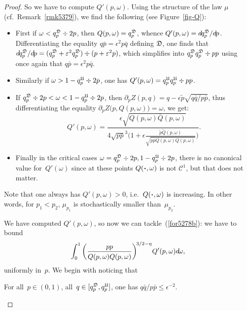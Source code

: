 \begin{proof}
So we have to compute $Q'(p,\omega)$.
Using the structure of the law $\mu$ (cf.\ Remark~\ref{rmk5379}),
we find the following (see Figure~\ref{fig-Q}):
%
\begin{itemize}
\item First if $\omega < q^{\mathfrak{D}}_p \div 2p$, then $Q(p,\omega) = q^{\mathfrak{D}}_p$,
whence $Q'(p,\omega) = \dx{q^{\mfrak{D}}_p}/\dx{p}$.
Differentiating the equality $q\bar{p}=\epsilon^2p\bar{q}$ defining $\mathfrak{D}$,
one finds that $\dx{q^{\mfrak{D}}_p}/\dx{p} = (q^{\mfrak{D}}_p + \epsilon^2\bar{q}^{\mfrak{D}}_p) \div (\bar{p}+\epsilon^2p)$,
which simplifies into $q^{\mfrak{D}}_p\bar{q}^{\mfrak{D}}_p \div p\bar{p}$ using once again
that $q\bar{p}=\epsilon^2p\bar{q}$.
\item Similarly if $\omega > 1 - \bar{q}^{\mfrak{U}}_p \div 2\bar{p}$,
one has $Q'(p,\omega) = q^{\mfrak{U}}_p\bar{q}^{\mfrak{U}}_p \div p\bar{p}$.
\item If $q^{\mfrak{D}}_p \div 2p < \omega < 1 - \bar{q}^{\mfrak{U}}_p \div 2\bar{p}$, then
$\partial_p Z(p,q) = q-\epsilon\tilde{p}\sqrt{q\bar{q}/p\bar{p}}$,
thus differentiating the equality $\partial_p Z \big(p,Q(p,\omega)\big) = \omega$,
we get:
\[ Q'(p,\omega) = \frac{\epsilon\sqrt{Q(p,\omega)\bar{Q}(p,\omega)}}
{4\sqrt{p\bar{p}}^3 \bigg( 1 + \epsilon \frac{\tilde{p}\tilde{Q}(p,\omega)}{\sqrt{p\bar{p}Q(p,\omega)\bar{Q}(p,\omega)}} \bigg)} .\]
\item Finally in the critical cases $\omega = q^{\mfrak{D}}_p \div 2p, 1 - \bar{q}^{\mfrak{U}}_p \div 2\bar{p}$,
there is no canonical value for~$Q'(\omega)$ since at these points
$Q(\Bcdot,\omega)$ is not $\mathcal{C}^1$, but that does not matter.
\end{itemize}

\begin{Rmk}
Note that one always has $Q'(p,\omega)>0$, i.e.\ $Q(\Bcdot,\omega)$ is increasing.
In other words, for $p_1 < p_2$, $\mu_{p_1}$ is stochastically smaller than~$\mu_{p_2}$.
\end{Rmk}

We have computed $Q'(p,\omega)$, so now we can tackle~(\ref{for5278b}):
we have to bound 
\[\label{for7401} \int_0^1 \bigg(\frac{p\bar{p}}{Q(p,\omega)\bar{Q}(p,\omega)}\bigg)^{\!3/2-\eta}
Q'(p,\omega) \dx{\omega} ,\]
uniformly in~$p$.
%
We begin with noticing that
\begin{Clm}\label{clm7320}
For all~$p\in(0,1)$, all~$q\in[q^{\mathfrak{D}}_p,q^{\mathfrak{U}}_p]$,
one has $q\bar{q}/p\bar{p} \leq \epsilon^{-2}$.
\end{Clm}


\end{proof}
